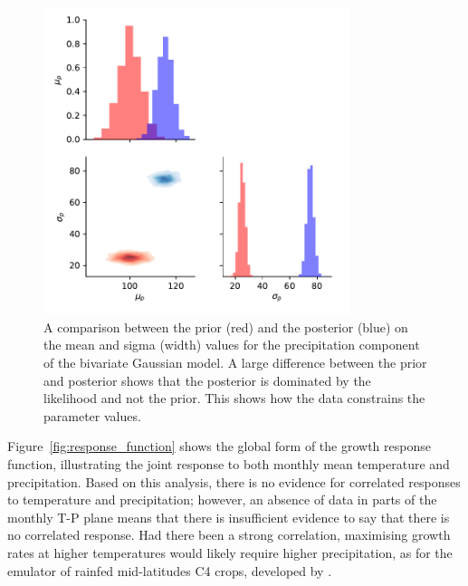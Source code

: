 \documentclass[12pt]{article}
\begin{document}
\begin{figure}
\centering
\includegraphics[width=0.8\textwidth]{./figures/2d_Gauss_prior_vs_post_precip_mean_vs_sigma}
\caption{\label{fig:2d_Gauss_prior_vs_post_precip_mean_vs_sigma} A comparison between the prior (red) and the posterior (blue) on the mean and sigma (width) values for the precipitation component of the bivariate Gaussian model. A large difference between the prior and posterior shows that the posterior is dominated by the likelihood and not the prior. This shows how the data constrains the parameter values.}
\end{figure}

Figure~\ref{fig:response_function} shows the global form of the growth response function, illustrating the joint response to both monthly mean temperature and precipitation. Based on this analysis, there is no evidence for correlated responses to temperature and precipitation; however, an absence of data in parts of the monthly T-P plane means that there is insufficient evidence to say that there is no correlated response. Had there been a strong correlation, maximising growth rates at higher temperatures would likely require higher precipitation, as for the emulator of rainfed mid-latitudes C4 crops, developed by \cite{snyder:2018}.
\end{document}
